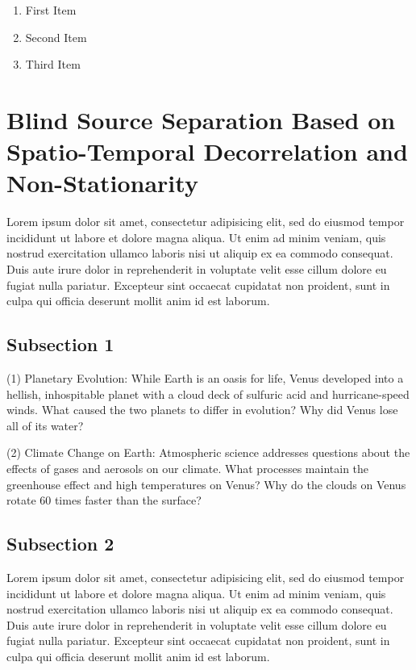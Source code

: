 \documentclass[5p]{elsarticle}
\begin{document}
\begin{enumerate}
\item First Item
\item Second Item
\item Third Item
\end{enumerate}

\section{Blind Source Separation Based on Spatio-Temporal Decorrelation and Non-Stationarity}

Lorem ipsum dolor sit amet, consectetur adipisicing elit, sed do eiusmod tempor incididunt ut labore et dolore magna aliqua. Ut enim ad minim veniam, quis nostrud exercitation ullamco laboris nisi ut aliquip ex ea commodo consequat. Duis aute irure dolor in reprehenderit in voluptate velit esse cillum dolore eu fugiat nulla pariatur. Excepteur sint occaecat cupidatat non proident, sunt in culpa qui officia deserunt mollit anim id est laborum.

\subsection{Subsection 1}

(1) Planetary Evolution: While Earth is an oasis for life, Venus developed into a hellish, inhospitable planet with a cloud deck of sulfuric acid and hurricane-speed winds. What caused the two planets to differ in evolution? Why did Venus lose all of its water?

(2) Climate Change on Earth: Atmospheric science addresses questions about the effects of gases and aerosols on our climate. What processes maintain the greenhouse effect and high temperatures on Venus? Why do the clouds on Venus rotate 60 times faster than the surface?

\subsection{Subsection 2}

Lorem ipsum dolor sit amet, consectetur adipisicing elit, sed do eiusmod tempor incididunt ut labore et dolore magna aliqua. Ut enim ad minim veniam, quis nostrud exercitation ullamco laboris nisi ut aliquip ex ea commodo consequat. Duis aute irure dolor in reprehenderit in voluptate velit esse cillum dolore eu fugiat nulla pariatur. Excepteur sint occaecat cupidatat non proident, sunt in culpa qui officia deserunt mollit anim id est laborum.
\end{document}
